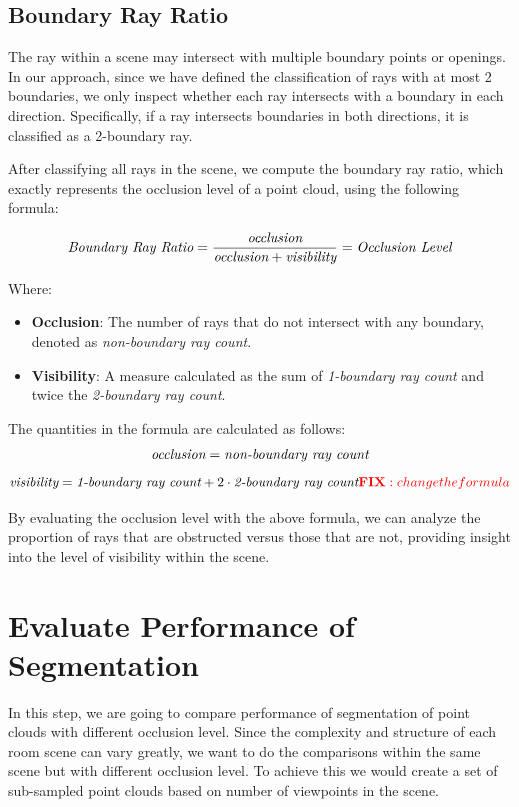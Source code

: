 \documentclass[11pt, a4paper,oneside,chapterprefix=false]{scrbook}
\newcommand{\FIXME}[1]{{\color{RED}{\textbf{FIX}: #1}}}
\begin{document}
\subsection{Boundary Ray Ratio}

The ray within a scene may intersect with multiple boundary points or openings. In our approach, since we have defined the classification of rays with at most 2 boundaries, we only inspect whether each ray intersects with a boundary in each direction. Specifically, if a ray intersects boundaries in both directions, it is classified as a 2-boundary ray.

\vspace{10pt}

After classifying all rays in the scene, we compute the boundary ray ratio, which exactly represents the occlusion level of a point cloud, using the following formula:

\[
\emph{{Boundary Ray Ratio}} = \frac{{\emph{{occlusion}}}}{{\emph{{occlusion}} + \emph{{visibility}}}} = \emph{{Occlusion Level}}
\]

Where:
\begin{itemize}
    \item \textbf{{Occlusion}}: The number of rays that do not intersect with any boundary, denoted as \emph{{non-boundary ray count}}.
    \item \textbf{{Visibility}}: A measure calculated as the sum of \emph{{1-boundary ray count}} and twice the \emph{{2-boundary ray count}}.
\end{itemize}

The quantities in the formula are calculated as follows:
\[
    \emph{{occlusion}} = \emph{{non-boundary ray count}}
\]
\[
    \emph{{visibility}} = \emph{{1-boundary ray count}} + 2 \cdot \emph{{2-boundary ray count}} \FIXME{change the formula}
\]

By evaluating the occlusion level with the above formula, we can analyze the proportion of rays that are obstructed versus those that are not, providing insight into the level of visibility within the scene.


\section{Evaluate Performance of Segmentation} \label{evaluate performance of segmentation}

In this step, we are going to compare performance of segmentation of point clouds with different occlusion level. Since the complexity and structure of each room scene can vary greatly, we want to do the comparisons within the same scene but with different occlusion level. To achieve this we would create a set of sub-sampled point clouds based on number of viewpoints in the scene.
\end{document}
